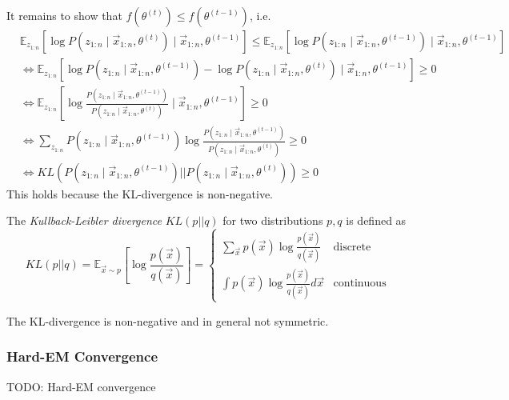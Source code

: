 It remains to show that $f(\theta^{(t)}) \leq f(\theta^{(t-1)})$,
i.e.
\begin{align*}
    & \mathbb{E}_{z_{1:n}}\left[
        \log{P(z_{1:n} \mid \vec{x}_{1:n}, \theta^{(t)})}
        \mid \vec{x}_{1:n}, \theta^{(t-1)}
    \right]
    \leq
    \mathbb{E}_{z_{1:n}}\left[
        \log{P(z_{1:n} \mid \vec{x}_{1:n}, \theta^{(t - 1)})}
        \mid \vec{x}_{1:n}, \theta^{(t-1)}
    \right] \\
    &\Leftrightarrow
    \mathbb{E}_{z_{1:n}}\left[
        \log{P(z_{1:n} \mid \vec{x}_{1:n}, \theta^{(t - 1)})}
        -
        \log{P(z_{1:n} \mid \vec{x}_{1:n}, \theta^{(t)})}
        \mid \vec{x}_{1:n}, \theta^{(t-1)}
    \right]
    \geq 0 \\
    &\Leftrightarrow
    \mathbb{E}_{z_{1:n}}\left[
        \log{
        \frac{P(z_{1:n} \mid \vec{x}_{1:n}, \theta^{(t - 1)})}{P(z_{1:n} \mid \vec{x}_{1:n}, \theta^{(t)})}
        }
        \mid \vec{x}_{1:n}, \theta^{(t-1)}
    \right]
    \geq 0 \\
    &\Leftrightarrow
    \sum_{z_{1:n}}{
        P(z_{1:n} \mid \vec{x}_{1:n}, \theta^{(t-1)})
        \log{
        \frac{P(z_{1:n} \mid \vec{x}_{1:n}, \theta^{(t - 1)})}{P(z_{1:n} \mid \vec{x}_{1:n}, \theta^{(t)})}
        }
    }
    \geq 0 \\
    &\Leftrightarrow
    KL(P(z_{1:n} \mid \vec{x}_{1:n}, \theta^{(t - 1)}) || P(z_{1:n} \mid \vec{x}_{1:n}, \theta^{(t)}))
    \geq 0
\end{align*}
This holds because the KL-divergence is non-negative.

The \emph{Kullback-Leibler divergence} $KL(p || q)$
for two distributions $p, q$ is defined as
\begin{equation*}
    KL(p || q) = \mathbb{E}_{\vec{x} \sim p}\left[
        \log{\frac{p(\vec{x})}{q(\vec{x})}}
    \right]
    = \begin{cases}
        \sum_{\vec{x}}{p(\vec{x}) \log{\frac{p(\vec{x})}{q(\vec{x})}}}
        & \text{discrete} \\
        \int{p(\vec{x}) \log{\frac{p(\vec{x})}{q(\vec{x})}} d\vec{x}}
        & \text{continuous}
    \end{cases}
\end{equation*}

The KL-divergence is non-negative
and in general not symmetric.

\subsubsection{Hard-EM Convergence}
TODO: Hard-EM convergence

